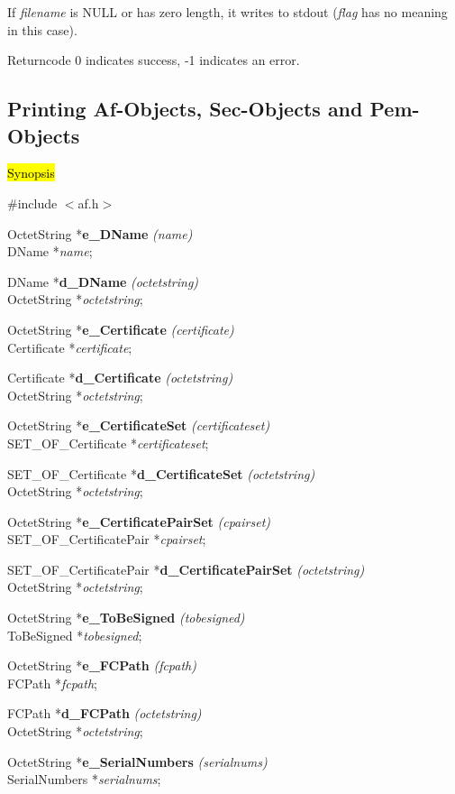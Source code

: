 If {\em filename} is NULL or has zero length, it writes
to stdout ({\em flag} has no meaning in this case).
 
Returncode 0 indicates success, -1 indicates an error.

\subsection{Printing Af-Objects, Sec-Objects and Pem-Objects}
\label{Encoding-/Decoding-Routinen}

\hl{Synopsis}

\#include $<$af.h$>$ 

OctetString *{\bf e\_DName} {\em (name)} \\
DName *{\em name};

DName *{\bf d\_DName} {\em (octetstring)} \\
OctetString *{\em octetstring};

OctetString *{\bf e\_Certificate} {\em (certificate)} \\
Certificate *{\em certificate};

Certificate *{\bf d\_Certificate} {\em (octetstring)} \\
OctetString *{\em octetstring};

OctetString *{\bf e\_CertificateSet} {\em (certificateset)} \\
SET\_OF\_Certificate *{\em certificateset};

SET\_OF\_Certificate *{\bf d\_CertificateSet} {\em (octetstring)} \\
OctetString *{\em octetstring};

OctetString *{\bf e\_CertificatePairSet} {\em (cpairset)} \\
SET\_OF\_CertificatePair *{\em cpairset};

SET\_OF\_CertificatePair *{\bf d\_CertificatePairSet} {\em (octetstring)} \\
OctetString *{\em octetstring};

OctetString *{\bf e\_ToBeSigned} {\em (tobesigned)} \\
ToBeSigned *{\em tobesigned};

OctetString *{\bf e\_FCPath} {\em (fcpath)} \\
FCPath *{\em fcpath};

FCPath *{\bf d\_FCPath} {\em (octetstring)} \\
OctetString *{\em octetstring};

OctetString *{\bf e\_SerialNumbers} {\em (serialnums)} \\
SerialNumbers *{\em serialnums};

